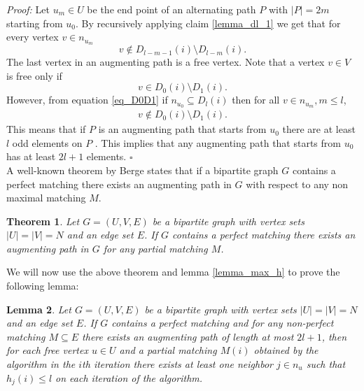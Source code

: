 \documentclass[11pt,onecolumn]{article}
\newcounter{theorem}
\newtheorem{lemma}[theorem]{Lemma}
\newcommand{\beq}{\begin{equation}}
\newcommand{\eeq}{\end{equation}}
\newcommand{\bea}{\begin{array}}
\newcommand{\ena}{\end{array}}
\newenvironment{proof}{\textit{Proof:}}{\hfill$\square$\\}
\newtheorem{theorem}{Theorem}
\begin{document}
\begin{proof}
Let $u_m\in U$ be the end point of an alternating path $P$ with $|P|=2m$ starting from $u_0$.
By recursively applying claim \ref{lemma_dl_1} we get that for every vertex $v\in n_{u_{m}}$
\beq\label{eq_D0D1}
v\not\in D_{l-m-1}(i)\setminus D_{l-m}(i).
\eeq
The last vertex in an augmenting path is a free vertex.
Note that a vertex $v\in V$ is free only if
\beq
v\in D_{0}(i)\setminus D_{1}(i).
\eeq
However, from equation \ref{eq_D0D1} if $n_{u_0}\subseteq D_l(i)$ then for all $v\in n_{u_{m}}, m\leq l$,
\beq
\bea{ll}
v\not\in D_{0}(i)\setminus D_{1}(i).
\ena
\eeq
This means that if $P$ is an augmenting path that starts from $u_0$ there are at least $l$ odd elements on $P$ .
This implies that any augmenting path that starts from $u_0$ has at least $2l+1$ elements.
\end{proof}
A well-known theorem by Berge \cite{berge1957two} states that if a bipartite graph $G$ contains a perfect matching there exists an augmenting path in $G$ with respect to any non maximal matching $M$.
\begin{theorem}\cite{berge1957two}
 \label{theorem_augment}  Let $G=(U,V,E)$ be a bipartite graph with vertex sets $|U|=|V|=N$ and an edge set $E$. If $G$ contains a perfect matching there exists an augmenting path in $G$ for any partial matching $M$.
 \end{theorem}
We will now use the above theorem and lemma \ref{lemma_max_h} to prove the following lemma:
\begin{lemma}
 \label{lemma_neighbour_less_l} Let $G=(U,V,E)$ be a bipartite graph with vertex sets $|U|=|V|=N$ and an edge set $E$. If $G$ contains a perfect matching and for any non-perfect matching $M\subseteq E$  there exists an augmenting path of length at most $2l+1$, then for each free vertex $u\in U$ and a partial matching $M(i)$ obtained by the algorithm in the $i$th iteration there exists at least one neighbor $j\in n_u$ such that $h_j(i)\leq l$ on each iteration of the algorithm.
 \end{lemma}
\end{document}
